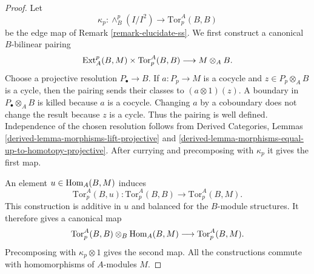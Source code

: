 \begin{proof}
Let
$$
\kappa_p : \wedge_B^p(I/I^2) \longrightarrow \text{Tor}_p^A(B, B)
$$
be the edge map of Remark \ref{remark-elucidate-ss}. We first construct a
canonical $B$-bilinear pairing
$$
\mathop{\mathrm{Ext}}\nolimits_A^p(B, M) \times \text{Tor}_p^A(B, B)
\longrightarrow M \otimes_A B.
$$
Choose a projective resolution $P_\bullet \to B$. If
$a : P_p \to M$ is a cocycle and $z \in P_p \otimes_A B$ is a cycle, then
the pairing sends their classes to $(a \otimes 1)(z)$. A boundary in
$P_\bullet \otimes_A B$ is killed because $a$ is a cocycle. Changing $a$
by a coboundary does not change the result because $z$ is a cycle. Thus the
pairing is well defined. Independence of the chosen resolution follows from
Derived Categories, Lemmas
\ref{derived-lemma-morphisms-lift-projective} and
\ref{derived-lemma-morphisms-equal-up-to-homotopy-projective}. After currying
and precomposing with $\kappa_p$ it gives the first map.

An element $u \in \mathop{\mathrm{Hom}}\nolimits_A(B, M)$ induces
$$
\text{Tor}_p^A(B, u) :
\text{Tor}_p^A(B, B) \longrightarrow \text{Tor}_p^A(B, M).
$$
This construction is additive in $u$ and balanced for the $B$-module
structures. It therefore gives a canonical map
$$
\text{Tor}_p^A(B, B) \otimes_B \mathop{\mathrm{Hom}}\nolimits_A(B, M)
\longrightarrow \text{Tor}_p^A(B, M).
$$
Precomposing with $\kappa_p \otimes 1$ gives the second map. All the
constructions commute with homomorphisms of $A$-modules $M$.
\end{proof}

